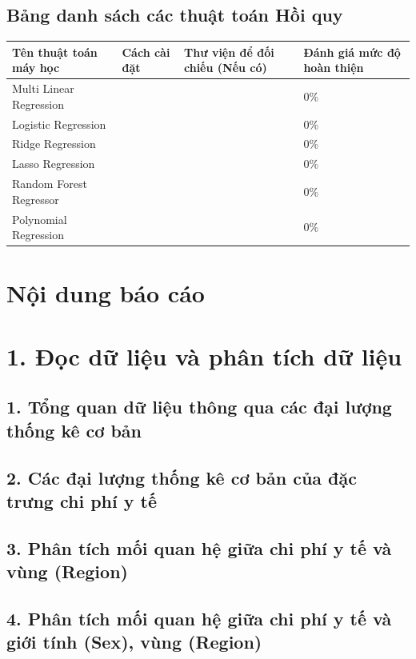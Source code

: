 \documentclass{article}
\newcommand\T{\rule{0pt}{2.6ex}}       %
\newcommand\B{\rule[-1.2ex]{0pt}{0pt}} %
\begin{document}
	\subsection{Bảng danh sách các thuật toán Hồi quy}
	\begin{center}
		\begin{tabular}{ | p{3cm} | p{5cm} | p{3cm} | p{3cm} |} \hline	
			Tên thuật toán máy học & Cách cài đặt & Thư viện để đối chiếu (Nếu có) & Đánh giá mức độ hoàn thiện\T\B\\\hline
			Multi Linear Regression & & & 0\%  \T\B\\\hline
			Logistic Regression & & & 0\%  \T\B\\\hline
			Ridge Regression & & & 0\%  \T\B\\\hline
			Lasso Regression & & & 0\%  \T\B\\\hline
			Random Forest Regressor & & & 0\%  \T\B\\\hline
			Polynomial Regression & & & 0\%  \T\B\\\hline
		\end{tabular}
	\end{center}		
	\section{Nội dung báo cáo}
	
	\section{1. Đọc dữ liệu và phân tích dữ liệu}
	
	\subsection{1. Tổng quan dữ liệu thông qua các đại lượng thống kê cơ bản}
	
	\subsection{2. Các đại lượng thống kê cơ bản của đặc trưng chi phí y tế}
	
	\subsection{3. Phân tích mối quan hệ giữa chi phí y tế và vùng (Region)}
	
	\subsection{4. Phân tích mối quan hệ giữa chi phí y tế và giới tính (Sex), vùng (Region)}
	
\end{document}
